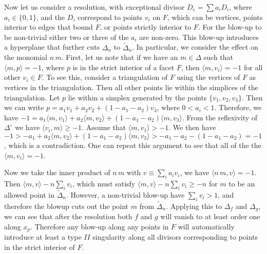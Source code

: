 \documentclass[aps,prl,twocolumn, superscriptaddress,groupedaddress,nofootinbib]{revtex4}
\begin{document}
Now let us consider a resolution, with exceptional divisor $D_e = \sum a_i D_i$, where $a_i \in \{ 0, 1\}$, and the $D_i$ correspond to points $v_i$ on $F$, which can be vertices, points interior to edges that bound $F$, or points strictly interior to $F$. For the blow-up to be non-trivial either two or three of the $a_i$ are non-zero. This blow-up introduces a hyperplane that further cuts $\Delta_n$ to $\tilde{\Delta}_n$. In particular, we consider the effect on the monomial $n\, m$. First, let us note that if we have an $m \in \Delta$ such that $\langle m, p \rangle = -1$, where $p$ is in the strict interior of a facet $F$, then $\langle m, v_i \rangle = -1$ for all other $v_i \in F$. To see this, consider a triangulation of $F$ using the vertices of $F$ as vertices in the triangulation. Then all other points lie within the simplices of the triangulation. Let $p$ lie within a simplex generated by the points $\{v_1, v_2, v_3\}$. Then we can write $ p = a_1 v_1 + a_2 v_2 + (1 -a_1 - a_2) v_3$, where $0 < a_i < 1$. Therefore, we have $-1 = a_1 \langle m, v_1\rangle + a_2 \langle m, v_2\rangle+ (1 - a_1 - a_2) \langle m, v_3\rangle$. From the reflexivity of $\Delta^\circ$ we have $\langle v_i, m \rangle \geq -1$. Assume that $\langle m, v_1\rangle > -1$. We then have $-1 > -a_1+ a_2 \langle m, v_2\rangle+ (1 - a_1 - a_2) \langle m, v_3\rangle > -a_1 -a_2 - (1 -a_1 - a_2) = -1$, which is a contradiction. One can repeat this argument to see that all of the the $\langle m, v_i\rangle = -1$. 

Now we take the inner product of $n\, m$ with $v \equiv \sum_i a_i v_i$, we have $\langle n\, m, v \rangle = -1$. Then $\langle m, v\rangle -n \sum_i v_i$, which must satisfy $\langle m, v\rangle -n \sum_i v_i \geq -n$ for $m$ to be an allowed point in $\tilde{\Delta}_n$. However, a non-trivial blow-up have $\sum_i v_i > 1$, and therefore the blowup cuts out the point $m$ from $\tilde{\Delta}_n$. Applying this to $\Delta_f$ and $\Delta_g$, we can see that after the resolution both $f$ and $g$ will vanish to at least order one along $x_p$. Therefore any blow-up along any points in $F$ will automatically introduce at least a type $II$ singularity along all divisors corresponding to points in the strict interior of $F$.
\end{document}
